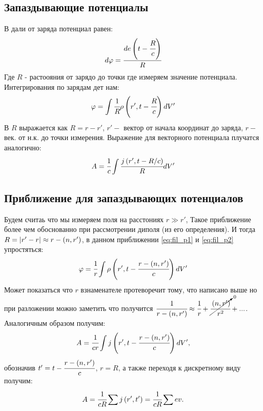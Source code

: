 \subsection{Запаздывающие потенциалы}
В дали от заряда потенциал равен:
\begin{equation}
    d\varphi = \cfrac{d e \left( t - \cfrac{R}{c} \right)}{R}
\end{equation}
Где $R$ - растоояния от зарядо до точки где измеряем значение потенциала. 
Интегрирования по зарядам дет нам:
\begin{equation}
    \varphi = \int \cfrac{1}{R} \rho\left( r', t - \cfrac{R}{c} \right) dV'
    \label{eq:fil_p1}
\end{equation}
В $R $ выражается как $R = r - r'$,  $r' -$ 
вектор от начала координат до заряда, $r -$ 
век. от н.к. до точки измерения. Выражение для 
векторного потенциала плучатся аналогично:
\begin{equation}
    A = \cfrac{1}{c} \int \cfrac{j \left( r',t - R/c \right)}{R} dV' 
    \label{eq:fil_p2}
\end{equation}

\subsection{Приближение для запаздывающих потенциалов}
Будем считаь что мы измеряем поля на расстониях $r \gg r'$, 
Такое приближение более чем обоснованно при рассмотрении диполя 
(из его определения). И тогда $R = \abs{r' - r} \approx r - \left( n,r' \right)$, 
в данном приближении \ref{eq:fil_p1} и \ref{eq:fil_p2} упростяться:
\begin{equation}
    \varphi = \cfrac{1}{r} \int \rho\left( r', t - \cfrac{r - \left( n,r' \right)}{c} \right) dV'
\end{equation}
Может показаться что $r$ взнаменателе протеворечит тому, 
что написано выше но при разложении можно заметить что получится 
$\cfrac{1}{r - \left( n,r' \right)} \approx \cfrac{1}{r} + \cancelto{0}{\cfrac{\left( n,r' \right)}{r^2}} + ...$.
Аналогичным образом получим:
\begin{equation}
    A = \cfrac{1}{cr} \int j \left( r',t - \cfrac{r - \left( n,r' \right)}{c} \right) dV',
\end{equation}
обозначив $t' = t - \cfrac{r - \left( n,r' \right)}{c}$, $r = R$,
 а также переходя к дискретному виду получим:
\begin{equation}
    A = \cfrac{1}{cR} \sum j \left( r',t' \right) = \cfrac{1}{cR} \sum ev.
\end{equation}